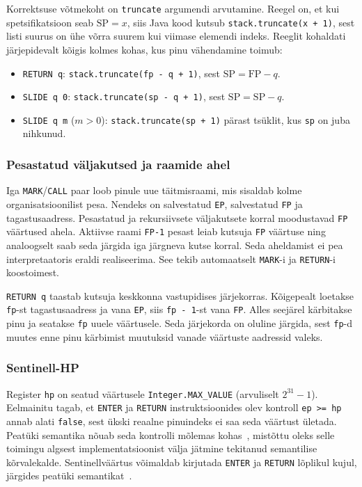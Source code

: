 Korrektsuse võtmekoht on \texttt{truncate} argumendi arvutamine. Reegel on, et kui spetsifikatsioon seab $\text{SP} = x$, siis Java kood kutsub \texttt{stack.truncate(x + 1)}, sest listi suurus on ühe võrra suurem kui viimase elemendi indeks. Reeglit kohaldati järjepidevalt kõigis kolmes kohas, kus pinu vähendamine toimub:
\begin{itemize}
	\item \texttt{RETURN q}: \texttt{stack.truncate(fp - q + 1)}, sest $\text{SP} = \text{FP} - q$.
	\item \texttt{SLIDE q 0}: \texttt{stack.truncate(sp - q + 1)}, sest $\text{SP} = \text{SP} - q$.
	\item \texttt{SLIDE q m} ($m > 0$): \texttt{stack.truncate(sp + 1)} pärast tsüklit, kus \texttt{sp} on juba nihkunud.
\end{itemize}

\subsubsection{Pesastatud väljakutsed ja raamide ahel}

Iga \texttt{MARK}/\texttt{CALL} paar loob pinule uue täitmisraami, mis sisaldab kolme organisatsioonilist pesa. Nendeks on salvestatud \texttt{EP}, salvestatud \texttt{FP} ja tagastusaadress. Pesastatud ja rekursiivsete väljakutsete korral moodustavad \texttt{FP} väärtused ahela. Aktiivse raami \texttt{FP-1} pesast leiab kutsuja \texttt{FP} väärtuse ning analoogselt saab seda järgida iga järgneva kutse korral. Seda aheldamist ei pea interpretaatoris eraldi realiseerima. See tekib automaatselt \texttt{MARK}-i ja \texttt{RETURN}-i koostoimest.

\texttt{RETURN q} taastab kutsuja keskkonna vastupidises järjekorras. Kõigepealt loetakse \texttt{fp}-st tagastusaadress ja vana \texttt{EP}, siis \texttt{fp - 1}-st vana \texttt{FP}. Alles seejärel kärbitakse pinu ja seatakse \texttt{fp} uuele väärtusele. Seda järjekorda on oluline järgida, sest \texttt{fp}-d muutes enne pinu kärbimist muutuksid vanade väärtuste aadressid valeks.

\subsubsection{Sentinell-HP}

Register \texttt{hp} on seatud väärtusele \texttt{Integer.MAX\_VALUE} (arvuliselt ${2^{31} - 1}$). Eelmainitu tagab, et \texttt{ENTER} ja \texttt{RETURN} instruktsioonides olev kontroll \texttt{ep >= hp} annab alati \texttt{false}, sest ükski reaalne pinuindeks ei saa seda väärtust ületada. Peatüki semantika nõuab seda kontrolli mõlemas kohas~\cite{wilhelm_imperative_2010}, mistõttu oleks selle toimingu algsest implementatsioonist välja jätmine tekitanud semantilise kõrvalekalde. Sentinellväärtus võimaldab kirjutada \texttt{ENTER} ja \texttt{RETURN} lõplikul kujul, järgides peatüki semantikat~\cite{wilhelm_imperative_2010}.

